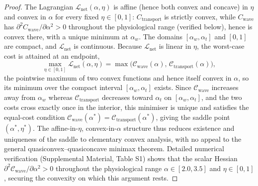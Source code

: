 \begin{proof}
The Lagrangian $\mathcal{L}_{\mathrm{net}}(\alpha,\eta)$ is affine (hence both
convex and concave) in $\eta$ and convex in $\alpha$ for every fixed $\eta
\in [0,1]$: $C_{\mathrm{transport}}$ is strictly convex, while
$C_{\mathrm{wave}}$ has $\partial^2 C_{\mathrm{wave}}/\partial\alpha^2 > 0$
throughout the physiological range (verified below), hence is convex there,
with a unique minimum at $\alpha_w$. The domains $[\alpha_w, \alpha_t]$ and
$[0,1]$ are compact, and $\mathcal{L}_{\mathrm{net}}$ is continuous.
Because $\mathcal{L}_{\mathrm{net}}$ is linear in $\eta$, the worst-case
cost is attained at an endpoint,
\begin{equation*}
  \max_{\eta\in[0,1]}\mathcal{L}_{\mathrm{net}}(\alpha,\eta)
  = \max\!\bigl(\mathcal{C}_{\mathrm{wave}}(\alpha),\,
                \mathcal{C}_{\mathrm{transport}}(\alpha)\bigr),
\end{equation*}
the pointwise maximum of two convex functions and hence itself convex in
$\alpha$, so its minimum over the compact interval $[\alpha_w,\alpha_t]$ exists.
Since $\mathcal{C}_{\mathrm{wave}}$ increases away from $\alpha_w$ whereas
$\mathcal{C}_{\mathrm{transport}}$ decreases toward $\alpha_t$ on
$[\alpha_w,\alpha_t]$, and the two costs cross exactly once in the interior,
this minimiser is unique and satisfies the equal-cost condition
$\mathcal{C}_{\mathrm{wave}}(\alpha^*)=\mathcal{C}_{\mathrm{transport}}(\alpha^*)$,
giving the saddle point $(\alpha^*,\eta^*)$. The affine-in-$\eta$,
convex-in-$\alpha$ structure thus reduces existence and uniqueness of the saddle
to elementary convex analysis, with no appeal to the general
quasiconvex--quasiconcave minimax theorem. Detailed numerical verification
(Supplemental Material, Table S1) shows that the scalar Hessian
$\partial^2 \mathcal{C}_{\mathrm{wave}}/\partial\alpha^2 > 0$ throughout the
physiological range $\alpha \in [2.0, 3.5]$ and $\eta \in [0,1]$, securing
the convexity on which this argument rests.


\end{proof}
